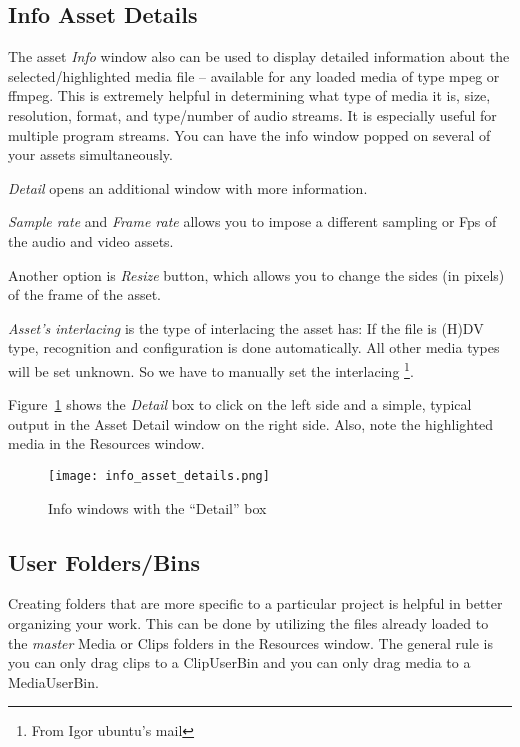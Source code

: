 \subsection{Info Asset Details}%
\label{sub:info_asset_details}

The asset \emph{Info} window also can be used to display detailed information about the selected/highlighted media file -- available for any loaded media of type mpeg or ffmpeg.  
This is extremely helpful in determining what type of media it is, size, resolution, format, and type/number of audio streams.  It is especially useful for multiple program streams.  You can have the info window popped on several of your assets simultaneously.

\textit{Detail} opens an additional window with more information.

\textit{Sample rate} and \textit{Frame rate} allows you to impose a different sampling or Fps of the audio and video assets.

Another option is \textit{Resize} button, which allows you to change the sides (in pixels) of the frame of the asset.

\textit{Asset's interlacing}  is the type of interlacing the asset has: If the file is (H)DV type, recognition and configuration is done automatically. All other media types will be set unknown. So we have to manually set the interlacing \protect\footnote{From Igor ubuntu's mail}.

Figure~\ref{fig:info_asset_details} shows the \textit{Detail} box to click on the left side and a simple, typical output in the Asset Detail window on the right side.  Also, note the highlighted media in the Resources window.

\begin{figure}[htpb]
    \centering
    \texttt{[image: info\_asset\_details.png]}
    \caption{Info windows with the “Detail” box}
    \label{fig:info_asset_details}
\end{figure}

\subsection{User Folders/Bins}%
\label{sub:user_folders_bins}

Creating folders that are more specific to a particular project is helpful in better organizing your work.  
This can be done by utilizing the files already loaded to the \textit{master} Media or Clips folders in the Resources window.  The general rule is you can only drag clips to a ClipUserBin and you can only drag media to a MediaUserBin.


